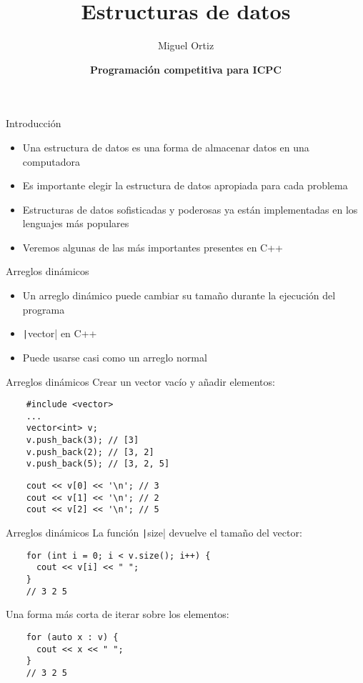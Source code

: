 \documentclass[10pt]{beamer}
\title{Estructuras de datos}
\author{Miguel Ortiz}
\institute{Abril 2023 - Cochabamba, Bolivia}
\date{\textbf{Programación competitiva para ICPC}}
\newcommand{\bi}{\begin{itemize}}
\newcommand{\ei}{\end{itemize}}
\begin{document}
\maketitle

\begin{frame}{Introducción}
    \bi
        \item Una estructura de datos es una forma de almacenar datos en una computadora
        \item Es importante elegir la estructura de datos apropiada para cada problema
        \item Estructuras de datos sofisticadas y poderosas ya están implementadas en los lenguajes más populares
        \item Veremos algunas de las más importantes presentes en C++
    \ei
\end{frame}

\begin{frame}[fragile]{Arreglos dinámicos}
  \bi
    \item Un arreglo dinámico puede cambiar su tamaño durante la ejecución del programa
    \item \texttt|vector| en C++
    \item Puede usarse casi como un arreglo normal
  \ei
\end{frame}

\begin{frame}[fragile]{Arreglos dinámicos}
  Crear un vector vacío y añadir elementos:
  \begin{verbatim}
    #include <vector>
    ...
    vector<int> v;
    v.push_back(3); // [3]
    v.push_back(2); // [3, 2]
    v.push_back(5); // [3, 2, 5]
  \end{verbatim}
  \begin{verbatim}
    cout << v[0] << '\n'; // 3
    cout << v[1] << '\n'; // 2
    cout << v[2] << '\n'; // 5
  \end{verbatim}
\end{frame}

\begin{frame}[fragile]{Arreglos dinámicos}
  La función \texttt|size| devuelve el tamaño del vector:
  \begin{verbatim}
    for (int i = 0; i < v.size(); i++) {
      cout << v[i] << " ";
    }
    // 3 2 5
  \end{verbatim}
  Una forma más corta de iterar sobre los elementos:
  \begin{verbatim}
    for (auto x : v) {
      cout << x << " ";
    }
    // 3 2 5
  \end{verbatim}
\end{frame}
\end{document}
